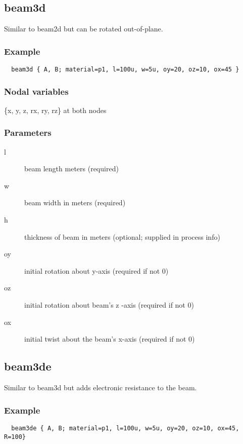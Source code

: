 \subsection{beam3d}
 
Similar to beam2d but can be rotated out-of-plane. 

\subsubsection*{Example}
\begin{verbatim}
  beam3d { A, B; material=p1, l=100u, w=5u, oy=20, oz=10, ox=45 }
\end{verbatim}
 
\subsubsection*{Nodal variables}

\{x, y, z, rx, ry, rz\} at both nodes 
 
\subsubsection{Parameters}
\begin{description}
 \item[l] beam length meters (required) 
 \item[w] beam width in meters (required) 
 \item[h] thickness of beam in meters (optional; supplied in process info) 
 \item[oy] initial rotation about y-axis (required if not 0) 
 \item[oz] initial rotation about beam's z -axis (required if not 0) 
 \item[ox] initial twist about the beam's x-axis (required if not 0) 
\end{description}

\subsection{beam3de}
 
Similar to beam3d but adds electronic resistance to the beam. 

\subsubsection*{Example}
\begin{verbatim}
  beam3de { A, B; material=p1, l=100u, w=5u, oy=20, oz=10, ox=45,  R=100}
\end{verbatim}
 
